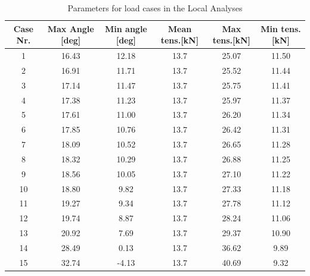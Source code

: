 \begin{table} [H]
\centering
\begin{tabular}{ |c|c|c|c|c|c|}
\hline
    Case Nr. & Max Angle [deg] & Min angle [deg] & Mean tens.[kN] & Max tens.[kN]  & Min tens.[kN]   \\
 \hline
 \hline
    1 & 16.43 & 12.18 & 13.7 & 25.07 & 11.50   \\ 
    2 &  16.91 & 11.71 & 13.7 & 25.52 & 11.44   \\
    3 &  17.14 & 11.47 & 13.7 & 25.75 & 11.41   \\ 
    4 &  17.38 & 11.23 & 13.7 & 25.97 & 11.37  \\ 
    5 &  17.61 & 11.00 & 13.7 & 26.20 & 11.34  \\ 
    6 &  17.85 & 10.76 & 13.7 & 26.42 & 11.31  \\ 
    7 &  18.09 & 10.52 & 13.7 & 26.65 & 11.28   \\ 
    8 &  18.32 & 10.29 & 13.7 & 26.88 & 11.25  \\ 
    9 &  18.56 & 10.05 & 13.7 & 27.10 & 11.22  \\ 
    10 &  18.80 & 9.82 & 13.7 & 27.33 & 11.18  \\ 
    11 & 19.27 & 9.34 & 13.7 & 27.78 & 11.12  \\ 
    12 &  19.74 & 8.87 & 13.7 & 28.24 & 11.06  \\ 
    13 &  20.92 & 7.69 & 13.7 & 29.37 & 10.90  \\ 
    14 &  28.49 & 0.13 & 13.7 & 36.62 & 9.89  \\ 
    15 &  32.74 & -4.13 & 13.7 & 40.69 & 9.32 \\ 
 \hline
\end{tabular}
\caption{Parameters for load cases in the Local Analyses}
\label{table:loadcase}
\end{table} 

